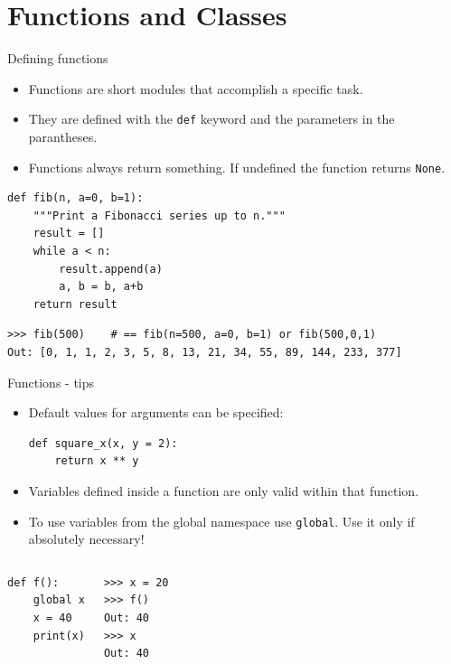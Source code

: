 \documentclass[compress%
,aspectratio=169%
]{beamer}
\newcommand{\code}{\lstinline}
\begin{document}
\section{Functions and Classes}
\begin{frame}[fragile]{Defining functions}
\begin{itemize}
\small
    \item Functions are short modules that accomplish a specific task.
    \item They are defined with the \code|def| keyword and the parameters in the parantheses.
    \item Functions always return something. If undefined the function returns \code|None|.
\end{itemize}

\begin{lstlisting}
def fib(n, a=0, b=1): 
    """Print a Fibonacci series up to n."""
    result = []
    while a < n:
        result.append(a)        
        a, b = b, a+b
    return result
\end{lstlisting}

\begin{lstlisting}
>>> fib(500)    # == fib(n=500, a=0, b=1) or fib(500,0,1)
Out: [0, 1, 1, 2, 3, 5, 8, 13, 21, 34, 55, 89, 144, 233, 377] 
\end{lstlisting}
\end{frame}

\begin{frame}[fragile]{Functions - tips}
    \begin{itemize}
        \item Default values for arguments can be specified:
        \begin{lstlisting}
def square_x(x, y = 2):
    return x ** y
\end{lstlisting}
    \item Variables defined inside a function are \alert{only valid within that function}.
    \item To use variables from the global namespace use \code|global|. Use it only if \alert{absolutely necessary!}
        \end{itemize}

\begin{columns}
 \begin{lstlisting}
def f():
    global x
    x = 40
    print(x)
\end{lstlisting}

\begin{lstlisting}
>>> x = 20
>>> f()
Out: 40
>>> x
Out: 40
\end{lstlisting}
\end{columns}

\end{frame}
\end{document}
